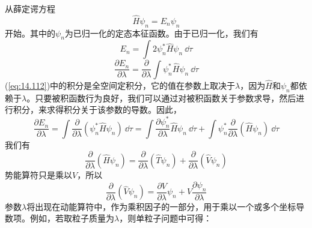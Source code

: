    从薛定谔方程
    \begin{equation}
        \hat{H} \psi_n = E_n \psi_n
        \label{eq:14.111}
    \end{equation}
    开始。其中的$\psi_n$为已归一化的定态本征函数。由于已归一化，我们有
    \begin{equation}
        E_n = \int 2\psi_n^* \hat{H} \psi_n \:\dd \tau
        \label{eq:14.112}
    \end{equation}
    \begin{equation}
        \frac{\partial E_n}{\partial \lambda} = \frac{\partial}{\partial \lambda} \int \psi_n^* \hat{H} \psi_n \:\dd \tau
        \label{eq:14.113}
    \end{equation}
    (\ref{eq:14.112})中的积分是全空间定积分，它的值在参数上取决于$\lambda$，因为$\hat{H}$和$\psi_n$都依赖于$\lambda$。只要被积函数行为良好，我们可以通过对被积函数关于参数求导，然后进行积分，来求得积分关于该参数的导数。因此，
    \begin{equation}
        \frac{\partial E_n}{\partial \lambda} = \int \frac{\partial}{\partial \lambda} \left(\psi_n^*\hat{H}\psi_n\right)\:\dd \tau = \int \frac{\partial \psi_n^*}{\partial \lambda} \hat{H} \psi_n \:\dd \tau + \int \psi_n^* \frac{\partial}{\partial \lambda} \left(\hat{H}\psi_n\right) \:\dd \tau
        \label{eq:14.114}
    \end{equation}
    我们有
    \begin{equation}
        \frac{\partial}{\partial \lambda} \left(\hat{H}\psi_n\right) = \frac{\partial}{\partial \lambda} \left(\hat{T}\psi_n\right) + \frac{\partial}{\partial \lambda} \left(\hat{V}\psi_n\right)
        \label{eq:14.115}
    \end{equation}
    势能算符只是乘以$V$，所以
    \begin{equation}
        \frac{\partial}{\partial \lambda} \left(\hat{V}\psi_n\right) = \frac{\partial V}{\partial \lambda} \psi_n + V \frac{\partial \psi_n}{\partial \lambda}
        \label{eq:14.116}
    \end{equation}
    参数$\lambda$将出现在动能算符中，作为乘积因子的一部分，用于乘以一个或多个坐标导数项。例如，若取粒子质量为$\lambda$，则单粒子问题中可得：
